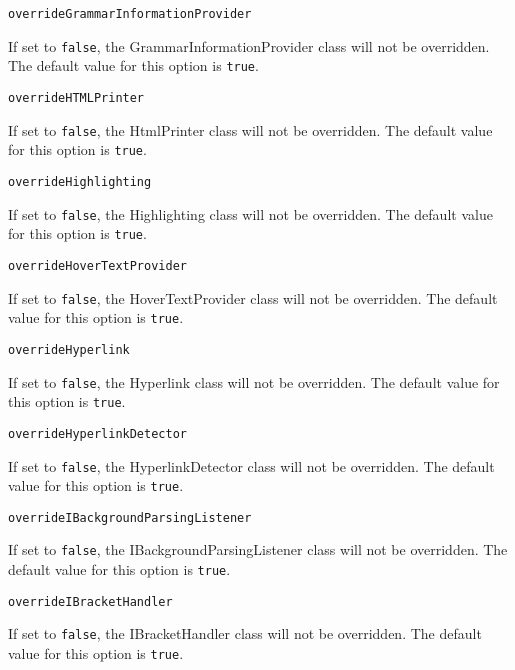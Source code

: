 \noindent\texttt{overrideGrammarInformationProvider}
\begin{myindentpar}{1cm}
If set to \texttt{false}, the GrammarInformationProvider class will not be overridden. The default value for this option is \texttt{true}.
\end{myindentpar}

\noindent\texttt{overrideHTMLPrinter}
\begin{myindentpar}{1cm}
If set to \texttt{false}, the HtmlPrinter class will not be overridden. The default value for this option is \texttt{true}.
\end{myindentpar}

\noindent\texttt{overrideHighlighting}
\begin{myindentpar}{1cm}
If set to \texttt{false}, the Highlighting class will not be overridden. The default value for this option is \texttt{true}.
\end{myindentpar}

\noindent\texttt{overrideHoverTextProvider}
\begin{myindentpar}{1cm}
If set to \texttt{false}, the HoverTextProvider class will not be overridden. The default value for this option is \texttt{true}.
\end{myindentpar}

\noindent\texttt{overrideHyperlink}
\begin{myindentpar}{1cm}
If set to \texttt{false}, the Hyperlink class will not be overridden. The default value for this option is \texttt{true}.
\end{myindentpar}

\noindent\texttt{overrideHyperlinkDetector}
\begin{myindentpar}{1cm}
If set to \texttt{false}, the HyperlinkDetector class will not be overridden. The default value for this option is \texttt{true}.
\end{myindentpar}

\noindent\texttt{overrideIBackgroundParsingListener}
\begin{myindentpar}{1cm}
If set to \texttt{false}, the IBackgroundParsingListener class will not be overridden. The default value for this option is \texttt{true}.
\end{myindentpar}

\noindent\texttt{overrideIBracketHandler}
\begin{myindentpar}{1cm}
If set to \texttt{false}, the IBracketHandler class will not be overridden. The default value for this option is \texttt{true}.
\end{myindentpar}

